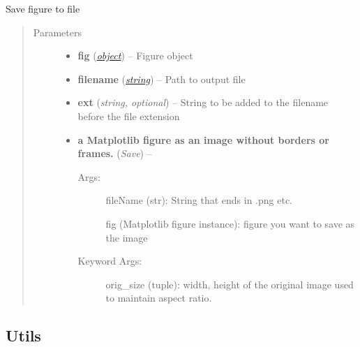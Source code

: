 \documentclass[letterpaper,10pt,english]{sphinxmanual}
\begin{document}
\begin{fulllineitems}
\label{flamingo/classification/index:flamingo.classification.plot.save_figure}
Save figure to file
\begin{quote}\begin{description}
\item[{Parameters}] \leavevmode\begin{itemize}
\item {} 
\textbf{fig} (\href{http://docs.python.org/library/functions.html\#object}{\emph{object}}) -- Figure object

\item {} 
\textbf{filename} (\href{http://docs.python.org/library/string.html\#module-string}{\emph{string}}) -- Path to output file

\item {} 
\textbf{ext} (\emph{string, optional}) -- String to be added to the filename before the file extension

\item {} 
\textbf{a Matplotlib figure as an image without borders or frames.} (\emph{Save}) -- \begin{description}
\item[{Args:}] \leavevmode
fileName (str): String that ends in .png etc.

fig (Matplotlib figure instance): figure you want to save as the image

\item[{Keyword Args:}] \leavevmode
orig\_size (tuple): width, height of the original image used to maintain
aspect ratio.

\end{description}


\end{itemize}

\end{description}\end{quote}

\end{fulllineitems}



\subsection{Utils}
\label{flamingo/classification/index:module-flamingo.classification.utils}\label{flamingo/classification/index:utils}
\end{document}

